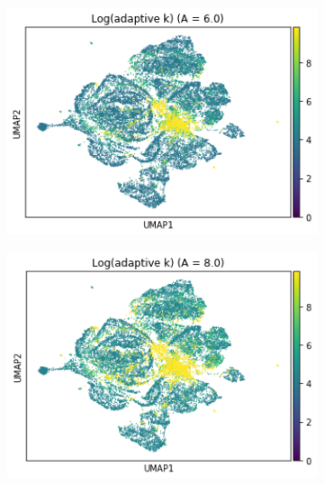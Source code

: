 \documentclass{article}
\begin{document}
\begin{figure}
    \begin{subfigure}[t]{0.32\textwidth}
    \centering
        \includegraphics[width=\linewidth]{figs/notMNIST_logadaK_Aeq6.png} 
    \end{subfigure}
    \begin{subfigure}[t]{0.32\textwidth}
        \centering
        \includegraphics[width=\linewidth]{figs/notMNIST_logadaK_Aeq8.png} 
    \end{subfigure}
    \begin{subfigure}[t]{0.32\textwidth}
        \centering

\end{subfigure}
\end{figure}
\end{document}
